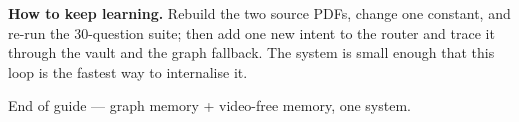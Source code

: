 \documentclass[10pt,a4paper]{article}
\begin{document}
\vspace{4pt}

\noindent
\textbf{How to keep learning.} Rebuild the two source PDFs, change one constant, and re-run the
30-question suite; then add one new intent to the router and trace it through the vault and the graph
fallback. The system is small enough that this loop is the fastest way to internalise it.

\vspace{6pt}

\begin{center}
{\color{muted}\small End of guide --- graph memory + video-free memory, one system.}
\end{center}
\end{document}
